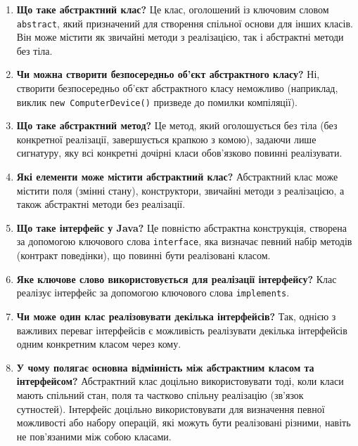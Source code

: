\begin{enumerate}
    \item \textbf{Що таке абстрактний клас?}
    Це клас, оголошений із ключовим словом \texttt{abstract}, який призначений для 
    створення спільної основи для інших класів. Він може містити як звичайні методи 
    з реалізацією, так і абстрактні методи без тіла.

    \item \textbf{Чи можна створити безпосередньо об'єкт абстрактного класу?}
    Ні, створити безпосередньо об'єкт абстрактного класу неможливо (наприклад, виклик 
    \texttt{new ComputerDevice()} призведе до помилки компіляції).

    \item \textbf{Що таке абстрактний метод?}
    Це метод, який оголошується без тіла (без конкретної реалізації, завершується 
    крапкою з комою), задаючи лише сигнатуру, яку всі конкретні дочірні класи обов'язково 
    повинні реалізувати.

    \item \textbf{Які елементи може містити абстрактний клас?}
    Абстрактний клас може містити поля (змінні стану), конструктори, звичайні методи з 
    реалізацією, а також абстрактні методи без реалізації.

    \item \textbf{Що таке інтерфейс у Java?}
    Це повністю абстрактна конструкція, створена за допомогою ключового слова 
    \texttt{interface}, яка визначає певний набір методів (контракт поведінки), що повинні 
    бути реалізовані класом.

    \item \textbf{Яке ключове слово використовується для реалізації інтерфейсу?}
    Клас реалізує інтерфейс за допомогою ключового слова \texttt{implements}.

    \item \textbf{Чи може один клас реалізовувати декілька інтерфейсів?}
    Так, однією з важливих переваг інтерфейсів є можливість реалізувати декілька інтерфейсів 
    одним конкретним класом через кому.

    \item \textbf{У чому полягає основна відмінність між абстрактним класом та інтерфейсом?}
    Абстрактний клас доцільно використовувати тоді, коли класи мають спільний стан, поля та 
    частково спільну реалізацію (зв'язок сутностей). Інтерфейс доцільно використовувати для 
    визначення певної можливості або набору операцій, які можуть бути реалізовані різними, 
    навіть не пов'язаними між собою класами.


\end{enumerate}
